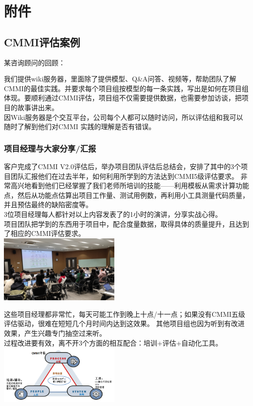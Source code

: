 \hypertarget{ux9644ux4ef6}{%
\section{附件}\label{ux9644ux4ef6}}

\hypertarget{cmmiux8bc4ux4f30ux6848ux4f8b}{%
\subsection{CMMI评估案例}\label{cmmiux8bc4ux4f30ux6848ux4f8b}}

某咨询顾问的回顾：

我们提供wiki服务器，里面除了提供模型、Q\&A问答、视频等，帮助团队了解CMMI的最佳实践。并要求每个项目组按模型的每一条实践，写出是如何在项目组体现。要顺利通过CMMI评估，项目组不仅需要提供数据，也需要参加访谈，把项目的故事讲出来。\\
因Wiki服务器是个交互平台，公司每个人都可以随时访问，所以评估组和我可以随时了解到他们对CMMI
实践的理解是否有错误。\\

\hypertarget{ux9879ux76eeux7ecfux7406ux4e0eux5927ux5bb6ux5206ux4eabux6c47ux62a5}{%
\subsubsection{项目经理与大家分享/汇报}\label{ux9879ux76eeux7ecfux7406ux4e0eux5927ux5bb6ux5206ux4eabux6c47ux62a5}}

客户完成了CMMI
V2.0评估后，举办项目团队评估后总结会，安排了其中的3个项目团队汇报他们在过去半年，如何利用所学到的方法达到CMMI5级评估要求。
非常高兴地看到他们已经掌握了我们老师所培训的技能------利用模板从需求计算功能点，然后从功能点估算出项目工作量、测试用例数，再利用小工具测量代码质量，并且预估最终的缺陷密度等。\\
3位项目经理每人都针对以上内容发表了的1小时的演讲，分享实战心得。\\
项目团队把学到的东西用于项目中，配合度量数据，取得具体的质量提升，且达到了相应的CMMI评估要求。\\

\includegraphics[width=6cm]{000.jpg}

这些项目经理都非常忙，每天可能工作到晚上十点/十一点；如果没有CMMI五级评估驱动，很难在短短几个月时间内达到这效果。
其他项目组也因为听到有改进效果，产生兴趣专门抽空过来听。\\
过程改进要有效，离不开3个方面的相互配合：培训+评估+自动化工具。\\

\includegraphics[width=6cm]{3个关键点图1.png}


